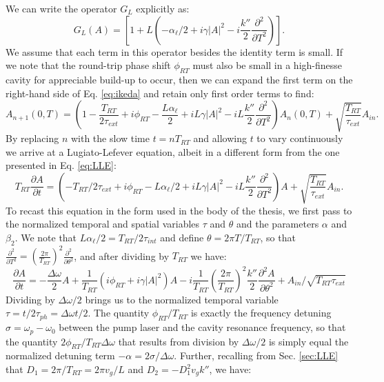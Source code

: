 We can write the operator $G_L$ explicitly as:
\begin{equation}
G_L(A)=\left[1+L\left(-\alpha_\ell/2 +i\gamma|A|^2-i\frac{k''}{2} \frac{\partial^2 }{\partial T^2}\right)\right].
\end{equation}
We assume that each term in this operator besides the identity term is small. If we note that the round-trip phase shift $\phi_{RT}$ must also be small in a high-finesse cavity for appreciable build-up to occur, then we can expand the first term on the right-hand side of Eq. \ref{eq:ikeda} and retain only first order terms to find:
\begin{equation}
A_{n+1}(0,T)=\left(1-\frac{T_{RT}}{2\tau_{ext}}+i\phi_{RT}-\frac{L\alpha_\ell}{2}+iL\gamma|A|^2-iL\frac{k''}{2} \frac{\partial^2 }{\partial T^2}\right)A_n(0,T)+\sqrt{\frac{T_{RT}}{\tau_{ext}}}A_{in}. \label{eq:ikedaxp}
\end{equation}
By replacing $n$ with the slow time $t=n T_{RT}$ and allowing $t$ to vary continuously we arrive at a Lugiato-Lefever equation, albeit in a different form from the one presented in Eq. \ref{eq:LLE}:
\begin{equation}
T_{RT}\frac{\partial A}{\partial t}=\left(-T_{RT}/2\tau_{ext}+i\phi_{RT}-L\alpha_\ell/2+iL\gamma|A|^2-iL\frac{k''}{2} \frac{\partial^2 }{\partial T^2}\right)A+\sqrt{\frac{T_{RT}}{\tau_{ext}}}A_{in}.
\end{equation}
To recast this equation in the form used in the body of the thesis, we first pass to the normalized temporal and spatial variables $\tau$ and $\theta$ and the parameters $\alpha$ and $\beta_2$. We note that $L\alpha_\ell/2=T_{RT}/2\tau_{int}$ and define $\theta=2\pi T/T_{RT}$, so that $\frac{\partial^2}{\partial T^2}=\left(\frac{2\pi}{T_{RT}}\right)^2\frac{\partial^2}{\partial\theta^2}$, and after dividing by $T_{RT}$ we have:
\begin{equation}
\frac{\partial A}{\partial t}=-\frac{\Delta\omega}{2}A+\frac{1}{T_{RT}}\left(i\phi_{RT}+i\gamma|A|^2\right)A-i\frac{1}{T_{RT}}\left(\frac{2\pi}{T_{RT}}\right)^2\frac{k''}{2} \frac{\partial^2 A }{\partial \theta^2}+A_{in}/\sqrt{T_{RT}\tau_{ext}}
\end{equation}
Dividing by $\Delta\omega/2$ brings us to the normalized temporal variable $\tau=t/2\tau_{ph}=\Delta\omega t/2$. The quantity $\phi_{RT}/T_{RT}$ is exactly the frequency detuning $\sigma=\omega_p-\omega_0$ between the pump laser and the cavity resonance frequency, so that the quantity $2\phi_{RT}/T_{RT}\Delta\omega$ that results from division by $\Delta\omega/2$ is simply equal the normalized detuning term $-\alpha=2\sigma/\Delta\omega$. Further, recalling from Sec. \ref{sec:LLE} that $D_1=2\pi/T_{RT}=2\pi v_g/L$ and $D_2=-D_1^2v_gk''$, we have:

